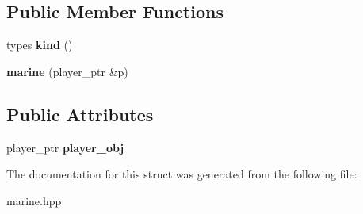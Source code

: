 \subsection*{Public Member Functions}
\begin{DoxyCompactItemize}
\item 
\mbox{\label{structmods_1_1classes_1_1marine_a8b47f56ced6a7fb1aab808745f9b6bcc}} 
types {\bfseries kind} ()
\item 
\mbox{\label{structmods_1_1classes_1_1marine_a6afc0fd635737e73162d09f8a147b5a0}} 
{\bfseries marine} (player\+\_\+ptr \&p)
\end{DoxyCompactItemize}
\subsection*{Public Attributes}
\begin{DoxyCompactItemize}
\item 
\mbox{\label{structmods_1_1classes_1_1marine_ac47ffaa6fcf954134f7747382820d957}} 
player\+\_\+ptr {\bfseries player\+\_\+obj}
\end{DoxyCompactItemize}


The documentation for this struct was generated from the following file\+:\begin{DoxyCompactItemize}
\item 
marine.\+hpp\end{DoxyCompactItemize}
